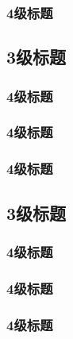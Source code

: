 \subsubsection{4级标题}
\subsection{3级标题}
\subsubsection{4级标题}
\subsubsection{4级标题}
\subsubsection{4级标题}
\subsection{3级标题}
\subsubsection{4级标题}
\subsubsection{4级标题}
\subsubsection{4级标题}

